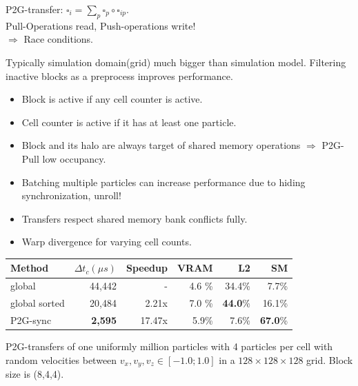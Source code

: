 \documentclass{beamer}
\begin{document}
\begin{frame}
\begin{minipage}{\textwidth}
  P2G-transfer: $\square_i = \sum_p \square_p \circ \square_{ip}.$\\
  
  Pull-Operations read, Push-operations write!\\
  $\Rightarrow$ Race conditions.
\end{minipage}
\end{frame}
\begin{frame}
  Typically simulation domain(grid) much bigger than simulation model. Filtering inactive blocks as a preprocess improves performance.
\begin{itemize}
  \item Block is active if any cell counter is active.
  \item Cell counter is active if it has at least one particle.
\end{itemize}
\vfill
\begin{minipage}{0.9\textwidth}
  \footnotesize
  
\end{minipage}
\end{frame}
\begin{frame}
\begin{itemize}
  \item Block and its halo are always target of shared memory operations $\Rightarrow$ P2G-Pull low occupancy.
  \item Batching multiple particles can increase performance due to hiding synchronization, unroll!
  \item Transfers respect shared memory bank conflicts fully.
  \item Warp divergence for varying cell counts.
\end{itemize}

{\footnotesize
\begin{table}
  \begin{tabular}{ | l | r | r | r | r | r |}    \hline
    Method                 &  $\Delta t_c(\mu s)$ &Speedup         &VRAM  & L2   &SM     \\\hline
    global                 &   44,442             &-               &4.6 \%&34.4\%&7.7\%  \\\hline
    global sorted          &   20,484		  &2.21x           &7.0 \%&\textbf{44.0}\%&16.1\% \\\hline
    P2G-sync              &    \textbf{2,595}    &17.47x          &5.9\%&7.6\%  &\textbf{67.0}\%\\\hline
 \end{tabular}
\end{table}
P2G-transfers of one uniformly million particles with 4 particles per cell with random velocities between $v_x,v_y,v_z \in [-1.0;1.0]$ in a $128\times 128\times128$ grid. Block size is (8,4,4).
}

\end{frame}
\end{document}
